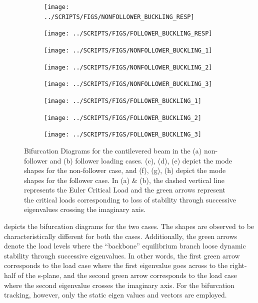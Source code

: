 \documentclass[10pt]{article}
\begin{document}
\begin{figure}[!h]
  \centering
  \begin{subfigure}{0.5\linewidth}
    \centering
    \texttt{[image: ../SCRIPTS/FIGS/NONFOLLOWER\_BUCKLING\_RESP]}
    \caption{}
  \end{subfigure}%
  \begin{subfigure}{0.5\linewidth}
    \centering
    \texttt{[image: ../SCRIPTS/FIGS/FOLLOWER\_BUCKLING\_RESP]}
    \caption{}
  \end{subfigure}%

  \begin{subfigure}{0.33\linewidth}
    \centering
    \texttt{[image: ../SCRIPTS/FIGS/NONFOLLOWER\_BUCKLING\_1]}
    \caption{}
  \end{subfigure}%
  \begin{subfigure}{0.33\linewidth}
    \centering
    \texttt{[image: ../SCRIPTS/FIGS/NONFOLLOWER\_BUCKLING\_2]}
    \caption{}
  \end{subfigure}%
  \begin{subfigure}{0.33\linewidth}
    \centering
    \texttt{[image: ../SCRIPTS/FIGS/NONFOLLOWER\_BUCKLING\_3]}
    \caption{}
  \end{subfigure}

  \begin{subfigure}{0.33\linewidth}
    \centering
    \texttt{[image: ../SCRIPTS/FIGS/FOLLOWER\_BUCKLING\_1]}
    \caption{}
  \end{subfigure}%
  \begin{subfigure}{0.33\linewidth}
    \centering
    \texttt{[image: ../SCRIPTS/FIGS/FOLLOWER\_BUCKLING\_2]}
    \caption{}
  \end{subfigure}%
  \begin{subfigure}{0.33\linewidth}
    \centering
    \texttt{[image: ../SCRIPTS/FIGS/FOLLOWER\_BUCKLING\_3]}
    \caption{}
  \end{subfigure}%
  \caption{Bifurcation Diagrams for the cantilevered beam in the (a)
    non-follower and (b) follower loading cases. (c), (d), (e) depict
    the mode shapes for the non-follower case, and (f), (g), (h)
    depict the mode shapes for the follower case. In (a) \& (b), the
    dashed vertical line represents the Euler Critical Load and the
    green arrows represent the critical loads corresponding to loss of
    stability through successive eigenvalues crossing the imaginary
    axis.}
  \label{fig:buckbif}
\end{figure}

 depicts the bifurcation diagrams for the two
cases. The shapes are observed to be characteristically different for
both the cases. Additionally, the green arrows denote the load levels
where the ``backbone'' equilibrium branch loose dynamic stability
through successive eigenvalues. In other words, the first green arrow
corresponds to the load case where the first eigenvalue goes across
to the right-half of the s-plane, and the second green arrow
corresponds to the load case where the second eigenvalue crosses the
imaginary axis. For the bifurcation tracking, however, only the static
eigen values and vectors are employed.
\end{document}
